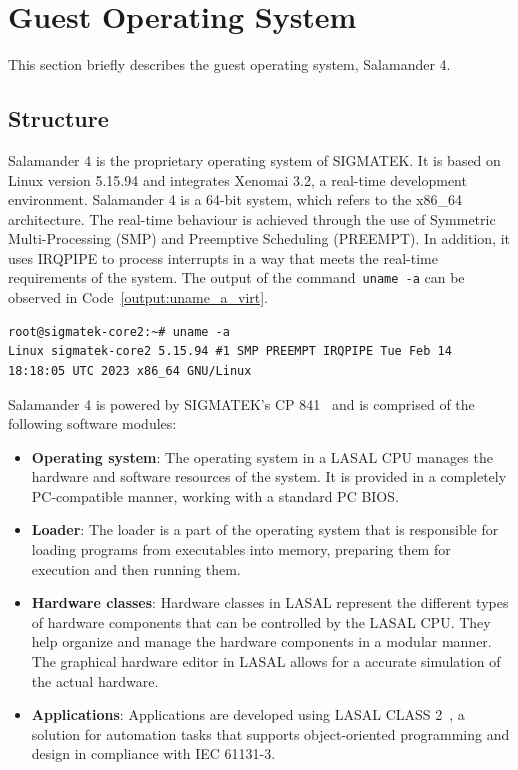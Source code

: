\documentclass[MMR,Master,english]{style/twbook}
\begin{document}
\section{Guest Operating System}\label{sec:guest_operating_system}
This section briefly describes the guest operating system, Salamander 4.

\subsection{Structure}
\noindent Salamander 4 is the proprietary operating system of SIGMATEK. It is based on Linux version 5.15.94 and integrates Xenomai 3.2, a real-time development environment. Salamander 4 is a 64-bit system, which refers to the x86\_64 architecture. The real-time behaviour is achieved through the use of Symmetric Multi-Processing (SMP) and Preemptive Scheduling (PREEMPT). In addition, it uses IRQPIPE to process interrupts in a way that meets the real-time requirements of the system. The output of the command~\texttt{uname -a} can be observed in Code~\ref{output:uname_a_virt}.

\vspace{2em}
\begin{lstlisting}[name={Guest Operating System Information},label={output:uname_a_virt}]
root@sigmatek-core2:~# uname -a
Linux sigmatek-core2 5.15.94 #1 SMP PREEMPT IRQPIPE Tue Feb 14 18:18:05 UTC 2023 x86_64 GNU/Linux
\end{lstlisting}

\noindent Salamander 4 is powered by SIGMATEK's CP 841~\cite{CPUUnitsSIGMATEK} and is comprised of the following software modules:

\begin{itemize}
	\item \textbf{Operating system}: The operating system in a LASAL CPU manages the hardware and software resources of the system. It is provided in a completely PC-compatible manner, working with a standard PC BIOS.
	\item \textbf{Loader}: The loader is a part of the operating system that is responsible for loading programs from executables into memory, preparing them for execution and then running them.
	\item \textbf{Hardware classes}: Hardware classes in LASAL represent the different types of hardware components that can be controlled by the LASAL CPU. They help organize and manage the hardware components in a modular manner. The graphical hardware editor in LASAL allows for a accurate simulation of the actual hardware.
	\item \textbf{Applications}: Applications are developed using LASAL CLASS 2~\cite{EngineeringToolLASAL}, a solution for automation tasks that supports object-oriented programming and design in compliance with IEC 61131-3.
\end{itemize}
\end{document}
